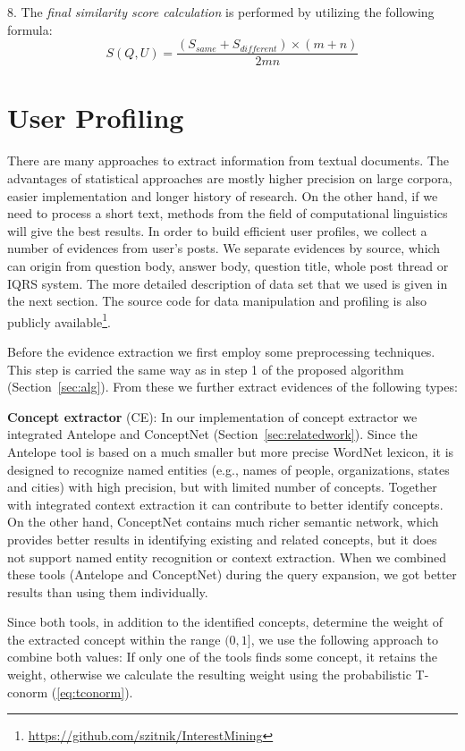 \documentclass[conference]{IEEEtran}
\newcommand{\secref}[1]{Section~\ref{#1}}
\begin{document}
8. The {\it final similarity score calculation} is performed by utilizing the following formula:
\begin{equation}
	\label{eq:s}
	S(Q,U) = \frac{(S_{same}+S_{different})\times (m+n)}{2mn}
\end{equation}
\section{User Profiling}
\label{sec:userprofiling}
There are many approaches to extract information from textual documents. The advantages of statistical approaches are mostly higher precision on large corpora, easier implementation and longer history of research. On the other hand, if we need to process a short text, methods from the field of computational linguistics will give the best results. In order to build efficient user profiles, we collect a number of evidences from user's posts. We separate evidences by source, which can origin from question body, answer body, question title, whole post thread or IQRS system. The more detailed description of data set that we used is given in the next section. The source code for data manipulation and profiling is also publicly available\footnote{\url{https://github.com/szitnik/InterestMining}}. 

Before the evidence extraction we first employ some preprocessing techniques. This step is carried the same way as in step 1 of the proposed algorithm (\secref{sec:alg}). From these we further extract evidences of the following types:

{\bf Concept extractor} (CE):
In our implementation of concept extractor we integrated Antelope and ConceptNet (\secref{sec:relatedwork}). Since the Antelope tool is based on a much smaller but more precise WordNet lexicon, it is designed to recognize named entities (e.g., names of people, organizations, states and cities) with high precision, but with limited number of concepts. Together with integrated context extraction it can contribute to better identify concepts. On the other hand, ConceptNet contains much richer semantic network, which provides better results in identifying existing and related concepts, but it does not support named entity recognition or context extraction. When we combined these tools (Antelope and ConceptNet) during the query expansion, we got better results than using them individually.

Since both tools, in addition to the identified concepts, determine the weight of the extracted concept within the range $(0,1]$, we use the following approach to combine both values: If only one of the tools finds some concept, it retains the weight, otherwise we calculate the resulting weight using the probabilistic T-conorm (\ref{eq:tconorm}). 
\end{document}
